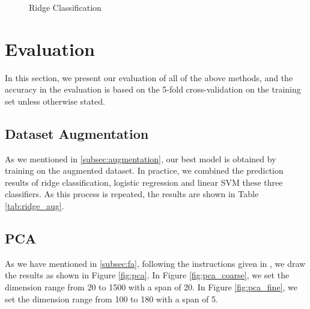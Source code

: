 \documentclass[10pt,journal,compsoc]{IEEEtran}
\begin{document}
\begin{figure}[!t]
{\begin{minipage}[t]{0.33\textwidth}
  \end{minipage}
  \label{fig:ridge_l2}
  }%
\caption{Ridge Classification}
\label{fig:ridge}
\end{figure}

\section{Evaluation}
\label{sec:evaluation}
In this section, we present our evaluation of all of the above methods, and the accuracy in the evaluation is based on the 5-fold cross-validation on the training set unless otherwise stated.

\subsection{Dataset Augmentation}
\label{subsec:dataset_aug}
As we mentioned in \ref{subsec:augmentation}, our best model is obtained by training on the augmented dataset. In practice, we combined the prediction results of ridge classification, logistic regression and linear SVM these three classifiers. As this process is repeated, the results are shown in Table \ref{tab:ridge_aug}.

\subsection{PCA}
\label{subsec:eva_pca}
As we have mentioned in \ref{subsec:fa}, following the instructions given in \cite{pcavsfa}, we draw the results as shown in Figure \ref{fig:pca}. In Figure \ref{fig:pca_coarse}, we set the dimension range from 20 to 1500 with a span of 20. In Figure \ref{fig:pca_fine}, we set the dimension range from 100 to 180 with a span of 5.
\end{document}

